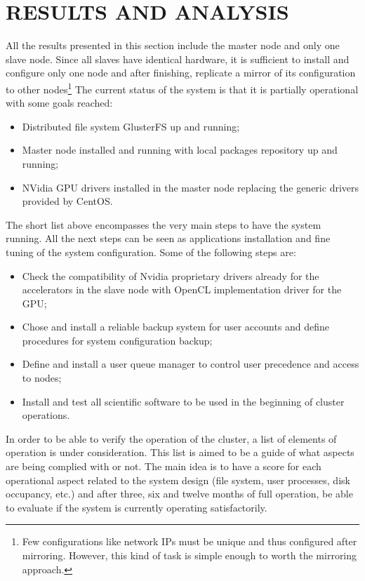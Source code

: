 \documentclass[twoside,a4paper,12pt,english]{inac17}
\begin{document}

\section{RESULTS AND ANALYSIS}

All the results presented in this section include the master node and only one slave node.
Since all slaves have identical hardware, it is sufficient to install and configure only one
node and after finishing, replicate a mirror of its configuration to other nodes\footnote{Few configurations like
  network IPs must be unique and thus configured after mirroring. However, this kind of task is simple enough to worth the mirroring approach.}
The current status of the system is that it is partially operational with some goals reached:

\begin{itemize}

\item Distributed file system GlusterFS up and running;
\item Master node installed and running with local packages repository up and running;
\item NVidia GPU drivers installed in the master node replacing the generic drivers provided by CentOS.
  
\end{itemize}

The short list above encompasses the very main steps to have the system running. All the next
steps can be seen as applications installation and fine tuning of the system configuration.
Some of the following steps are:

\begin{itemize}
\item Check the compatibility of Nvidia proprietary drivers already for the accelerators in the slave node with OpenCL implementation driver for the GPU;
\item Chose and install a reliable backup system for user accounts and define procedures for system configuration backup;
\item Define and install a user queue manager to control user precedence and access to nodes;
\item Install and test all scientific software to be used in the beginning of cluster operations.
\end{itemize}

In order to be able to verify the operation of the cluster, a list of elements of operation is under consideration.
This list is aimed to be a guide of what aspects are being complied with or not. The main idea is to have a score for
each operational aspect related to the system design (file system, user processes, disk occupancy, etc.) and after three, six and twelve months of full operation, be able to evaluate if the system is currently
operating satisfactorily.
\end{document}

